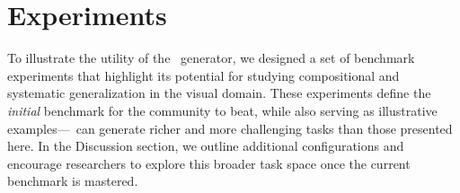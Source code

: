 \section{Experiments}

To illustrate the utility of the \generatorName\ generator, we designed a set of benchmark experiments that highlight its potential for studying compositional and systematic generalization in the visual domain.
These experiments define the \textit{initial} benchmark for the community to beat, while also serving as illustrative examples---\generatorName\ can generate richer and more challenging tasks than those presented here. In the Discussion section, we outline additional configurations and encourage researchers to explore this broader task space once the current benchmark is mastered.





